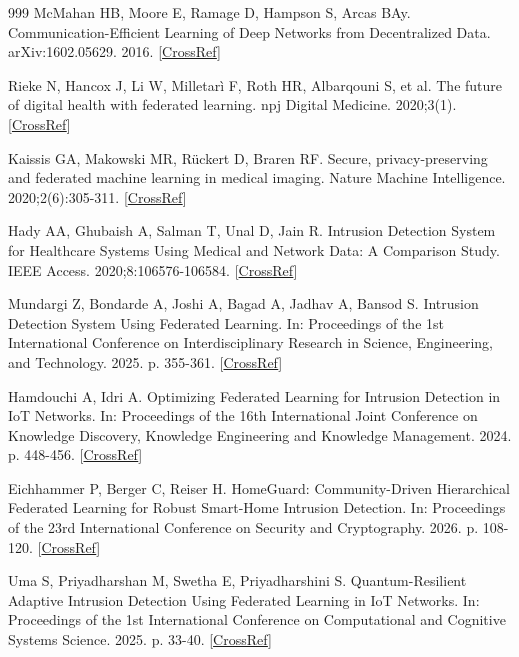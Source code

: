 \documentclass[cmc,article,submit,moreauthors,pdftex]{Definitions/tsp}
\begin{document}
\begin{thebibliography}{999}
McMahan HB, Moore E, Ramage D, Hampson S, Arcas BAy. Communication-Efficient Learning of Deep Networks from Decentralized Data. arXiv:1602.05629. 2016. [\href{https://doi.org/10.48550/arXiv.1602.05629}{CrossRef}]

Rieke N, Hancox J, Li W, Milletarì F, Roth HR, Albarqouni S, et al. The future of digital health with federated learning. npj Digital Medicine. 2020;3(1). [\href{https://doi.org/10.1038/s41746-020-00323-1}{CrossRef}]

Kaissis GA, Makowski MR, Rückert D, Braren RF. Secure, privacy-preserving and federated machine learning in medical imaging. Nature Machine Intelligence. 2020;2(6):305-311. [\href{https://doi.org/10.1038/s42256-020-0186-1}{CrossRef}]

Hady AA, Ghubaish A, Salman T, Unal D, Jain R. Intrusion Detection System for Healthcare Systems Using Medical and Network Data: A Comparison Study. IEEE Access. 2020;8:106576-106584. [\href{https://doi.org/10.1109/access.2020.3000421}{CrossRef}]

Mundargi Z, Bondarde A, Joshi A, Bagad A, Jadhav A, Bansod S. Intrusion Detection System Using Federated Learning. In: Proceedings of the 1st International Conference on Interdisciplinary Research in Science, Engineering, and Technology. 2025. p. 355-361. [\href{https://doi.org/10.5220/0014531600005061}{CrossRef}]

Hamdouchi A, Idri A. Optimizing Federated Learning for Intrusion Detection in IoT Networks. In: Proceedings of the 16th International Joint Conference on Knowledge Discovery, Knowledge Engineering and Knowledge Management. 2024. p. 448-456. [\href{https://doi.org/10.5220/0013040000003838}{CrossRef}]

Eichhammer P, Berger C, Reiser H. HomeGuard: Community-Driven Hierarchical Federated Learning for Robust Smart-Home Intrusion Detection. In: Proceedings of the 23rd International Conference on Security and Cryptography. 2026. p. 108-120. [\href{https://doi.org/10.5220/0015063200004103}{CrossRef}]

Uma S, Priyadharshan M, Swetha E, Priyadharshini S. Quantum-Resilient Adaptive Intrusion Detection Using Federated Learning in IoT Networks. In: Proceedings of the 1st International Conference on Computational and Cognitive Systems Science. 2025. p. 33-40. [\href{https://doi.org/10.5220/0014930000005024}{CrossRef}]


\end{thebibliography}
\end{document}
